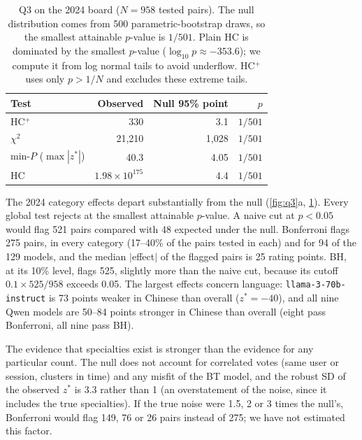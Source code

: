 \documentclass[12pt]{article}
\begin{document}
\begin{table}[t]
\centering\small
\caption{Q3 on the 2024 board ($N = 958$ tested pairs). The null distribution comes from 500 parametric-bootstrap draws, so the smallest attainable $p$-value is $1/501$. Plain HC is dominated by the smallest $p$-value ($\log_{10}p \approx -353.6$); we compute it from log normal tails to avoid underflow. HC$^+$ uses only $p > 1/N$ and excludes these extreme tails.}\label{tab:q3}
\begin{tabular}{@{}lrrr@{}}
\toprule
Test & Observed & Null 95\% point & $p$ \\
\midrule
HC$^+$ & 330 & 3.1 & $1/501$ \\
$\chi^2$ & 21{,}210 & 1{,}028 & $1/501$ \\
min-$P$ ($\max|z^*|$) & 40.3 & 4.05 & $1/501$ \\
HC & $1.98 \times 10^{175}$ & 4.4 & $1/501$ \\
\bottomrule
\end{tabular}

\end{table}

The 2024 category effects depart substantially from the null (\cref{fig:q3}a, \cref{tab:q3}). Every global test rejects at the smallest attainable $p$-value. A naive cut at $p < 0.05$ would flag 521 pairs compared with 48 expected under the null. Bonferroni flags 275 pairs, in every category (17--40\% of the pairs tested in each) and for 94 of the 129 models, and the median $|$effect$|$ of the flagged pairs is 25 rating points. BH, at its 10\% level, flags 525, slightly more than the naive cut, because its cutoff $0.1 \times 525/958$ exceeds 0.05. The largest effects concern language: \texttt{llama-3-70b-instruct} is 73 points weaker in Chinese than overall ($z^* = -40$), and all nine Qwen models are 50--84 points stronger in Chinese than overall (eight pass Bonferroni, all nine pass BH).

The evidence that specialties exist is stronger than the evidence for any particular count. The null does not account for correlated votes (same user or session, clusters in time) and any misfit of the BT model, and the robust SD of the observed $z^*$ is 3.3 rather than 1 (an overstatement of the noise, since it includes the true specialties). If the true noise were 1.5, 2 or 3 times the null's, Bonferroni would flag 149, 76 or 26 pairs instead of 275; we have not estimated this factor.
\end{document}
